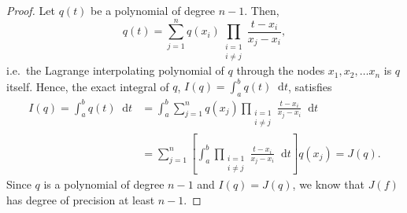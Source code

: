 \documentclass[12pt]{article}
\theoremstyle{definition}
\newcommand*\diff{\mathop{}\!\mathrm{d}}
\begin{document}
\begin{proof}
  Let $q(t)$ be a polynomial of degree $n-1$. Then,
  \[
    q(t) = \sum_{j=1}^n q(x_i) \prod_{\substack{i=1\\i\neq j}} \frac{t - x_i}{x_j - x_i},
  \]
  i.e.\ the Lagrange interpolating polynomial of $q$ through the nodes $x_1, x_2, \dots x_n$ is $q$ itself.
  Hence, the exact integral of $q$, $I(q) = \int_a^b q(t) \diff{t}$, satisfies
  \begin{align*}
    I(q) = \int_a^b q(t) \diff{t}
    &= \int_a^b \sum_{j=1}^{n} q(x_j) \prod_{\substack{i=1\\i\neq j}} \frac{t - x_i}{x_j - x_i} \diff{t} \\
    &= \sum_{j=1}^{n} \left[\int_a^b \prod_{\substack{i=1\\i\neq j}} \frac{t - x_i}{x_j - x_i} \diff{t} \right] q(x_j) = J(q).
  \end{align*}
  Since $q$ is a polynomial of degree $n-1$ and $I(q) = J(q)$, we know that $J(f)$
  has degree of precision at least $n-1$.
\end{proof}
\end{document}
